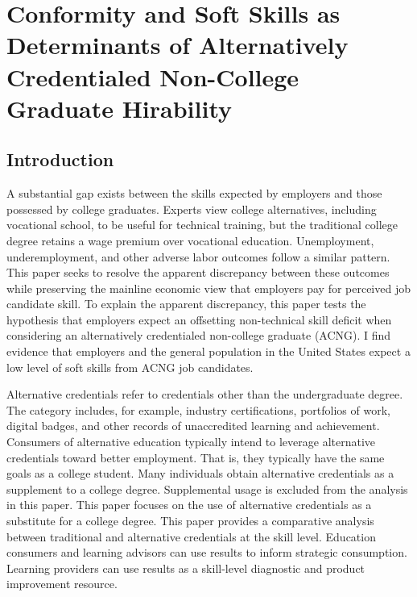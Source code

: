 
\chapter[]{\large Conformity and Soft Skills as Determinants of Alternatively Credentialed Non-College Graduate Hirability}

\section{Introduction}

A substantial gap exists between the skills expected by employers and those possessed by college graduates\cite{mcgarry2016examination, malik2017great, abbasi2018analysis, gingras2000there}.
Experts view college alternatives,
including vocational school,
to be useful for technical training,
but the traditional college degree retains a wage premium over vocational education.
Unemployment, underemployment, and other adverse labor outcomes follow a similar pattern\cite{smith_2011}.
This paper seeks to resolve the apparent discrepancy between these outcomes while preserving the mainline economic view that employers pay for perceived job candidate skill.
To explain the apparent discrepancy,
this paper tests the hypothesis that employers expect an offsetting non-technical skill deficit when considering an alternatively credentialed non-college graduate (ACNG).
I find evidence that employers and the general population in the United States expect a low level of soft skills from ACNG job candidates.

Alternative credentials refer to credentials other than the undergraduate degree\cite{brown2017complex}.
The category includes, for example,
industry certifications,
portfolios of work,
digital badges, and other records of unaccredited learning and achievement.
Consumers of alternative education typically intend to leverage alternative credentials toward better employment.
That is, they typically have the same goals as a college student.
Many individuals obtain alternative credentials as a supplement to a college degree.
Supplemental usage is excluded from the analysis in this paper.
This paper focuses on the use of alternative credentials as a substitute for a college degree.
This paper provides a comparative analysis between traditional and alternative credentials at the skill level.
Education consumers and learning advisors can use results to inform strategic consumption.
Learning providers can use results as a skill-level diagnostic and product improvement resource.

